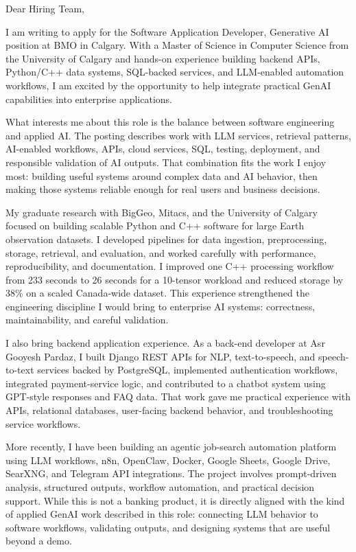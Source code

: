 \documentclass[11pt]{letter}
\begin{document}
\begin{letter}{}

\opening{Dear Hiring Team,}

I am writing to apply for the Software Application Developer, Generative AI position at BMO in Calgary. With a Master of Science in Computer Science from the University of Calgary and hands-on experience building backend APIs, Python/C++ data systems, SQL-backed services, and LLM-enabled automation workflows, I am excited by the opportunity to help integrate practical GenAI capabilities into enterprise applications.

What interests me about this role is the balance between software engineering and applied AI. The posting describes work with LLM services, retrieval patterns, AI-enabled workflows, APIs, cloud services, SQL, testing, deployment, and responsible validation of AI outputs. That combination fits the work I enjoy most: building useful systems around complex data and AI behavior, then making those systems reliable enough for real users and business decisions.

My graduate research with BigGeo, Mitacs, and the University of Calgary focused on building scalable Python and C++ software for large Earth observation datasets. I developed pipelines for data ingestion, preprocessing, storage, retrieval, and evaluation, and worked carefully with performance, reproducibility, and documentation. I improved one C++ processing workflow from 233 seconds to 26 seconds for a 10-tensor workload and reduced storage by 38\% on a scaled Canada-wide dataset. This experience strengthened the engineering discipline I would bring to enterprise AI systems: correctness, maintainability, and careful validation.

I also bring backend application experience. As a back-end developer at Asr Gooyesh Pardaz, I built Django REST APIs for NLP, text-to-speech, and speech-to-text services backed by PostgreSQL, implemented authentication workflows, integrated payment-service logic, and contributed to a chatbot system using GPT-style responses and FAQ data. That work gave me practical experience with APIs, relational databases, user-facing backend behavior, and troubleshooting service workflows.

More recently, I have been building an agentic job-search automation platform using LLM workflows, n8n, OpenClaw, Docker, Google Sheets, Google Drive, SearXNG, and Telegram API integrations. The project involves prompt-driven analysis, structured outputs, workflow automation, and practical decision support. While this is not a banking product, it is directly aligned with the kind of applied GenAI work described in this role: connecting LLM behavior to software workflows, validating outputs, and designing systems that are useful beyond a demo.


\end{letter}
\end{document}
